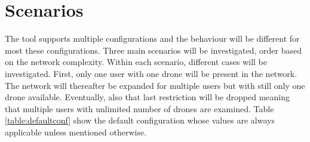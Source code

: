 \chapter{Scenarios}
\label{chap:scenarios}
The tool supports multiple configurations and the behaviour will be different for most these configurations. Three main scenarios 
will be investigated, order based on the network complexity. Within each scenario, different cases will be investigated.
First, only one user with one drone will be present in the network. The network will thereafter be expanded
for multiple users but with still only one drone available. Eventually, also that last restriction will be dropped meaning 
that multiple users with unlimited number of drones are examined. 
Table \ref{table:defaultconf} show the default configuration whose values are always applicable unless mentioned otherwise.


